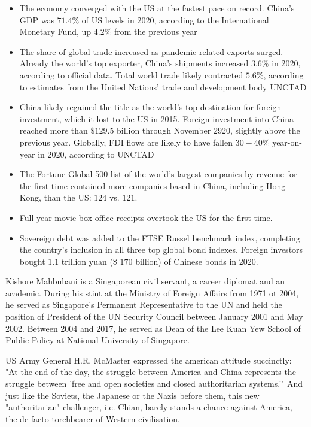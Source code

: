 \begin{itemize}
    \item The economy converged with the US at the fastest pace on record.
        China's GDP was $71.4\%$ of US levels in 2020, according to the
        International Monetary Fund, up $4.2\%$ from the previous year
    \item The share of global trade increased as pandemic-related exports
        surged. Already the world's top exporter, China's shipments increased
        $3.6\%$ in 2020, according to official data. Total world trade likely
        contracted $5.6\%$, according to estimates from the United Nations'
        trade and development body UNCTAD
    \item China likely regained the title as the world's top destination for
        foreign investment, which it lost to the US in 2015. Foreign investment
        into China reached more than $\$129.5$ billion through November 2920,
        slightly above the previous year. Globally, FDI flows are likely to have
        fallen $30-40\%$ year-on-year in 2020, according to UNCTAD
    \item The Fortune Global 500 list of the world's largest companies by
        revenue for the first time contained more companies based in China,
        including Hong Kong, than the US: $124$ vs. $121$.
    \item Full-year movie box office receipts overtook the US for the first
        time.
    \item Sovereign debt was added to the FTSE Russel benchmark index,
        completing the country's inclusion in all three top global bond
        indexes. Foreign investors bought $1.1$ trillion yuan (\$ $170$
        billion) of Chinese bonds in 2020.
\end{itemize}

Kishore Mahbubani is a Singaporean civil servant, a career diplomat and an
academic. During his stint at the Ministry of Foreign Affairs from 1971 ot
2004, he served as Singapore's Permanent Representative to the UN and held
the position of President of the UN Security Council between January 2001
and May 2002. Between 2004 and 2017, he served as Dean of the Lee Kuan Yew
School of Public Policy at National University of Singapore.

\vspace{1\baselineskip}

US Army General H.R. McMaster expressed the american attitude succinctly:
"At the end of the day, the struggle between America and China represents
the struggle between 'free and open societies and closed authoritarian
systems.'" And just like the Soviets, the Japanese or the Nazis before them,
this new "authoritarian" challenger, i.e. Chian, barely stands a chance
against America, the de facto torchbearer of Western civilisation.

